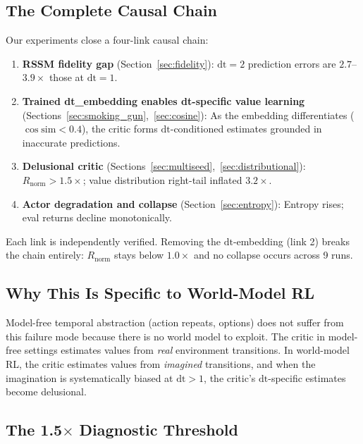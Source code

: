 \documentclass[10pt,letterpaper]{article}
\begin{document}
\subsection{The Complete Causal Chain}

Our experiments close a four-link causal chain:

\begin{enumerate}
    \item \textbf{RSSM fidelity gap} (Section~\ref{sec:fidelity}): $\mathrm{dt}{=}2$ prediction errors are $2.7$--$3.9\times$ those at $\mathrm{dt}{=}1$.
    \item \textbf{Trained dt\_embedding enables dt-specific value learning} (Sections~\ref{sec:smoking_gun},~\ref{sec:cosine}): As the embedding differentiates ($\cos \text{sim} < 0.4$), the critic forms $\mathrm{dt}$-conditioned estimates grounded in inaccurate predictions.
    \item \textbf{Delusional critic} (Sections~\ref{sec:multiseed},~\ref{sec:distributional}): $R_{\text{norm}} > 1.5\times$; value distribution right-tail inflated $3.2\times$.
    \item \textbf{Actor degradation and collapse} (Section~\ref{sec:entropy}): Entropy rises; eval returns decline monotonically.
\end{enumerate}

Each link is independently verified. Removing the $\mathrm{dt}$-embedding (link 2) breaks the chain entirely: $R_{\text{norm}}$ stays below $1.0\times$ and no collapse occurs across 9 runs.

\subsection{Why This Is Specific to World-Model RL}

Model-free temporal abstraction (action repeats, options) does not suffer from this failure mode because there is no world model to exploit. The critic in model-free settings estimates values from \emph{real} environment transitions. In world-model RL, the critic estimates values from \emph{imagined} transitions, and when the imagination is systematically biased at $\mathrm{dt}{>}1$, the critic's $\mathrm{dt}$-specific estimates become delusional.

\subsection{The 1.5$\times$ Diagnostic Threshold}
\end{document}
